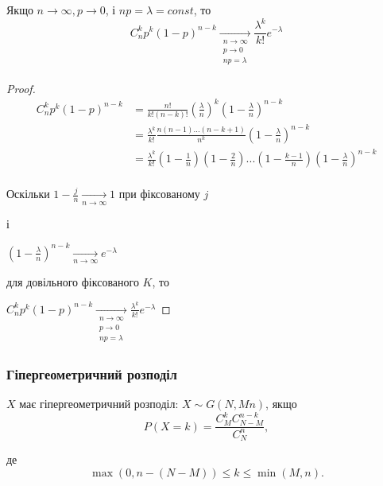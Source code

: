 \begin{claim}
    Якщо $n \rightarrow \infty, p \rightarrow 0$,  і $np = \lambda = const$, 
    то 
    $$C_n^k p^k (1-p)^{n-k} \xrightarrow[\begin{array}{c}
        n \rightarrow \infty \\
        p \rightarrow 0 \\
        np = \lambda \\
    \end{array}]{} \frac{\lambda^k}{k!} e^{-\lambda}$$
\end{claim}
\begin{proof}
    $$\begin{array}{rl} 
        C_n^k p^k (1-p)^{n-k} &
        = \frac{n!}{k!(n-k)!} (\frac{\lambda}{n})^k (1 - \frac{\lambda}{n})^{n-k} \\
        & = \frac{\lambda^k}{k!} \frac{n(n-1)...(n-k+1)}{n^k} (1 - \frac{\lambda}{n})^{n-k} \\
        & = \frac{\lambda^k}{k!} (1 - \frac{1}{n}) (1 - \frac{2}{n}) ... (1 - \frac{k - 1}{n}) (1 - \frac{\lambda}{n})^{n-k} \\
    \end{array}$$

    Оскільки $1 - \frac{j}{n} \xrightarrow[n \rightarrow \infty]{} 1$ при фіксованому $j$ 
    
    і 

    $(1-\frac{\lambda}{n})^{n-k} \xrightarrow[n \rightarrow \infty]{} e^{-\lambda}$
    
    для довільного фіксованого $K$, 
    то
    
    $C_n^k p^k (1-p)^{n-k} \xrightarrow[\begin{array}{c}
            n \rightarrow \infty \\
            p \rightarrow 0 \\
            np = \lambda \\
        \end{array}]{} \frac{\lambda^k}{k!} e^{-\lambda}$
\end{proof}

\subsubsection{Гіпергеометричний розподіл}

$X$ має гіпергеометричний розподіл: $X \sim G(N, M n)$, якщо 
$$P(X=k) = \frac{C_M^k C_{N-M}^{n-k}}{C_N^n},$$

де 
$$\max(0, n-(N-M)) \leqslant k \leqslant \min(M, n).$$

